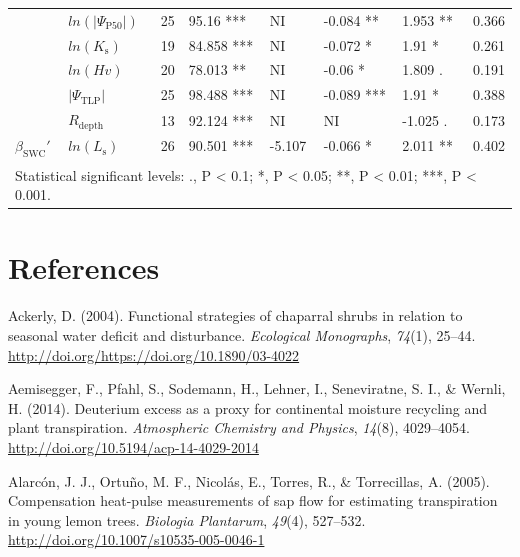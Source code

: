\documentclass[11pt,twoside]{reedthesis}
\begin{document}
\begin{table}
{\begin{tabular}[t]{llrllllr}
\cmidrule{1-8}
 & $ln(\rvert\Psi_{\text{P50}}\rvert)$ & 25 & 95.16 *** & NI & -0.084 ** & 1.953 ** & 0.366\\
\cmidrule{2-8}
 & $ln(K_{\text{s}})$ & 19 & 84.858 *** & NI & -0.072 * & 1.91 * & 0.261\\
\cmidrule{2-8}
 & $ln(Hv)$ & 20 & 78.013 ** & NI & -0.06 * & 1.809 . & 0.191\\
\cmidrule{2-8}
 & $\rvert\Psi_{\text{TLP}}\rvert$ & 25 & 98.488 *** & NI & -0.089 *** & 1.91 * & 0.388\\
\cmidrule{2-8}
 & $R_{\text{depth}}$ & 13 & 92.124 *** & NI & NI & -1.025 . & 0.173\\
\cmidrule{2-8}
\multirow{-6}{*}{\raggedright\arraybackslash $\beta_{\text{SWC}}'$} & $ln(L_{\text{s}})$ & 26 & 90.501 *** & -5.107 & -0.066 * & 2.011 ** & 0.402\\
\bottomrule
\multicolumn{8}{l}{\textsuperscript{} Statistical significant levels: ., P < 0.1; *, P < 0.05; **, P < 0.01; ***, P < 0.001.}\\
\end{tabular}}
\end{table}
\chapter*{References}\label{references}


\noindent

\setlength{\parindent}{-0.20in} \setlength{\leftskip}{0.20in}
\setlength{\parskip}{8pt}

\hypertarget{refs}{}
\hypertarget{ref-Ackerly2004}{}
Ackerly, D. (2004). Functional strategies of chaparral shrubs in
relation to seasonal water deficit and disturbance. \emph{Ecological
Monographs}, \emph{74}(1), 25--44.
\url{http://doi.org/https://doi.org/10.1890/03-4022}

\hypertarget{ref-Aemisegger2014}{}
Aemisegger, F., Pfahl, S., Sodemann, H., Lehner, I., Seneviratne, S. I.,
\& Wernli, H. (2014). Deuterium excess as a proxy for continental
moisture recycling and plant transpiration. \emph{Atmospheric Chemistry
and Physics}, \emph{14}(8), 4029--4054.
\url{http://doi.org/10.5194/acp-14-4029-2014}

\hypertarget{ref-Alarcon2005}{}
Alarcón, J. J., Ortuño, M. F., Nicolás, E., Torres, R., \& Torrecillas,
A. (2005). Compensation heat-pulse measurements of sap flow for
estimating transpiration in young lemon trees. \emph{Biologia
Plantarum}, \emph{49}(4), 527--532.
\url{http://doi.org/10.1007/s10535-005-0046-1}
\end{document}
